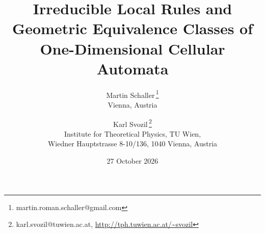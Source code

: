 \documentclass[11pt,a4paper]{article}
\newcommand{\rev}[1]{{\color{blue}#1}}
\newcommand{\rev}[1]{{\color{black}#1}}
\begin{document}
\title{\rev{Irreducible Local Rules and Geometric Equivalence Classes of One-Dimensional Cellular Automata}}

\author{
    Martin Schaller\,\thanks{martin.roman.schaller@gmail.com} \\
    \small{Vienna, Austria}
    \and
    Karl Svozil\,\thanks{karl.svozil@tuwien.ac.at, \url{http://tph.tuwien.ac.at/~svozil}} \\
    \small{Institute for Theoretical Physics, TU Wien,} \\
    \small{Wiedner Hauptstrasse 8-10/136, 1040 Vienna, Austria}
}

\date{27 October 2026}
\maketitle
\linenumbers
\end{document}
